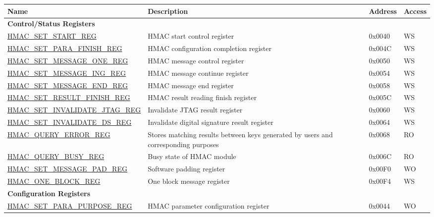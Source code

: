 \begin{longtable}{ | p{5.5cm} | p{6cm} | p{2cm} | p{0.8cm} | }
    \hline\rowcolor{lightgray}
    \textbf{Name} & \textbf{Description} & \textbf{Address} & \textbf{Access} \\ \hline
    \endhead
    \multicolumn{4}{|l|}{\textbf{Control/Status Registers}} \\ \hline
    \hyperref[regdesc:HMACSETSTARTREG]{HMAC\_SET\_START\_REG} & HMAC start control register & 0x0040 & WS \\ \hline
    \hyperref[regdesc:HMACSETPARAFINISHREG]{HMAC\_SET\_PARA\_FINISH\_REG} & HMAC configuration completion register & 0x004C & WS \\ \hline
    \hyperref[regdesc:HMACSETMESSAGEONEREG]{HMAC\_SET\_MESSAGE\_ONE\_REG} & HMAC message control register & 0x0050 & WS \\ \hline
    \hyperref[regdesc:HMACSETMESSAGEINGREG]{HMAC\_SET\_MESSAGE\_ING\_REG} & HMAC message continue register & 0x0054 & WS \\ \hline
    \hyperref[regdesc:HMACSETMESSAGEENDREG]{HMAC\_SET\_MESSAGE\_END\_REG} & HMAC message end register & 0x0058 & WS \\ \hline
    \hyperref[regdesc:HMACSETRESULTFINISHREG]{HMAC\_SET\_RESULT\_FINISH\_REG} & HMAC result reading finish register & 0x005C & WS \\ \hline
    \hyperref[regdesc:HMACSETINVALIDATEJTAGREG]{HMAC\_SET\_INVALIDATE\_JTAG\_REG} & Invalidate JTAG result register & 0x0060 & WS \\ \hline
    \hyperref[regdesc:HMACSETINVALIDATEDSREG]{HMAC\_SET\_INVALIDATE\_DS\_REG} & Invalidate digital signature result register & 0x0064 & WS \\ \hline
    \hyperref[regdesc:HMACQUERYERRORREG]{HMAC\_QUERY\_ERROR\_REG} & Stores matching results between keys generated by users and corresponding purposes & 0x0068 & RO \\ \hline
    \hyperref[regdesc:HMACQUERYBUSYREG]{HMAC\_QUERY\_BUSY\_REG} & Busy state of HMAC module & 0x006C & RO \\ \hline
    \hyperref[regdesc:HMACSETMESSAGEPADREG]{HMAC\_SET\_MESSAGE\_PAD\_REG} & Software padding register & 0x00F0 & WO \\ \hline
    \hyperref[regdesc:HMACONEBLOCKREG]{HMAC\_ONE\_BLOCK\_REG} & One block message register & 0x00F4 & WS \\ \hline
    \multicolumn{4}{|l|}{\textbf{Configuration Registers}} \\ \hline
    \hyperref[regdesc:HMACSETPARAPURPOSEREG]{HMAC\_SET\_PARA\_PURPOSE\_REG} & HMAC parameter configuration register & 0x0044 & WO \\ \hline

\end{longtable}
